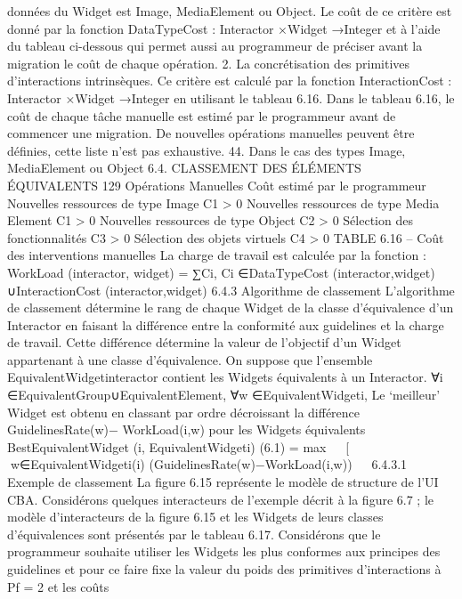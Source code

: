 \documentclass{article}
\begin{document}
donn\'{e}es du Widget est Image, MediaElement ou Object. Le co\^{u}t de ce crit\`{e}re est donn\'{e} par la
fonction
DataTypeCost : Interactor ×Widget →Integer
et \`{a} l’aide du tableau ci-dessous qui permet aussi au programmeur de pr\'{e}ciser avant la migration
le co\^{u}t de chaque op\'{e}ration.
2. La concr\'{e}tisation des primitives d’interactions intrins\`{e}ques. Ce crit\`{e}re est calcul\'{e} par la fonction
InteractionCost : Interactor ×Widget →Integer
en utilisant le tableau 6.16.
Dans le tableau 6.16, le co\^{u}t de chaque t\^{a}che manuelle est estim\'{e} par le programmeur avant de
commencer une migration. De nouvelles op\'{e}rations manuelles peuvent \^{e}tre d\'{e}ﬁnies, cette liste n’est
pas exhaustive.
44. Dans le cas des types Image, MediaElement ou Object
6.4. CLASSEMENT DES ÉLÉMENTS ÉQUIVALENTS
129
Op\'{e}rations Manuelles
Co\^{u}t estim\'{e} par le
programmeur
Nouvelles ressources de type
Image
C1 > 0
Nouvelles ressources de type
Media Element
C1 > 0
Nouvelles ressources de type
Object
C2 > 0
S\'{e}lection des fonctionnalit\'{e}s
C3 > 0
S\'{e}lection des objets virtuels
C4 > 0
TABLE 6.16 – Co\^{u}t des interventions manuelles
La charge de travail est calcul\'{e}e par la fonction :
WorkLoad (interactor, widget) = ∑Ci,
Ci ∈DataTypeCost (interactor,widget) ∪InteractionCost (interactor,widget)
6.4.3
Algorithme de classement
L’algorithme de classement d\'{e}termine le rang de chaque Widget de la classe d’\'{e}quivalence d’un
Interactor en faisant la diff\'{e}rence entre la conformit\'{e} aux guidelines et la charge de travail. Cette
diff\'{e}rence d\'{e}termine la valeur de l’objectif d’un Widget appartenant \`{a} une classe d’\'{e}quivalence. On
suppose que l’ensemble EquivalentWidgetinteractor contient les Widgets \'{e}quivalents \`{a} un Interactor.
∀i ∈EquivalentGroup∪EquivalentElement,
∀w ∈EquivalentWidgeti,
Le ‘meilleur’ Widget est obtenu en classant par ordre d\'{e}croissant la diff\'{e}rence GuidelinesRate(w)−
WorkLoad(i,w) pour les Widgets \'{e}quivalents
BestEquivalentWidget (i, EquivalentWidgeti)
(6.1)
=
max


[
∀w∈EquivalentWidgeti(i)
(GuidelinesRate(w)−WorkLoad(i,w))


6.4.3.1
Exemple de classement
La ﬁgure 6.15 repr\'{e}sente le mod\`{e}le de structure de l’UI CBA. Consid\'{e}rons quelques interacteurs
de l’exemple d\'{e}crit \`{a} la ﬁgure 6.7 ; le mod\`{e}le d’interacteurs de la ﬁgure 6.15 et les Widgets de leurs
classes d’\'{e}quivalences sont pr\'{e}sent\'{e}s par le tableau 6.17.
Consid\'{e}rons que le programmeur souhaite utiliser les Widgets les plus conformes aux principes
des guidelines et pour ce faire ﬁxe la valeur du poids des primitives d’interactions \`{a} Pf = 2 et les co\^{u}ts
\end{document}
